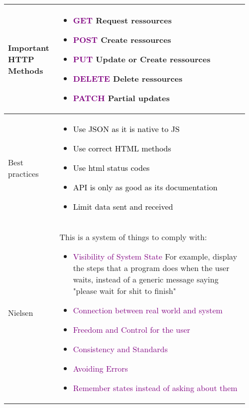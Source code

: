 \documentclass[main.tex,fontsize=8pt,paper=a4,paper=portrait,DIV=calc,]{scrartcl}
\begin{document}
\begin{table}[ht!]
\begin{tabular}{|m{0.2\linewidth}|m{0.755\linewidth}|}
\hline
Important HTTP Methods & 
\vspace{2mm}
\begin{itemize}
\item \textcolor{purple}{GET}\newline
  Request ressources
\item \textcolor{purple}{POST}\newline
  Create ressources
\item \textcolor{purple}{PUT}\newline
  Update or Create ressources
\item \textcolor{purple}{DELETE}\newline
  Delete ressources
\item \textcolor{purple}{PATCH}\newline
  Partial updates
\vspace{-3mm}
\end{itemize} \\
\hline
Best practices & 
\vspace{2mm}
\begin{itemize}
\item \textcolor{black}{Use JSON as it is native to JS}
\item \textcolor{black}{Use correct HTML methods}
\item \textcolor{black}{Use html status codes}
\item \textcolor{black}{API is only as good as its documentation}
\item \textcolor{black}{Limit data sent and received}
\vspace{-3mm}
\end{itemize}\\ 
\hline
Nielsen & 
This is a system of things to comply with:\newline
\begin{itemize}
\item \textcolor{purple}{Visibility of System State}\newline
  For example, display the steps that a program does when the user waits, instead of a generic message saying "please wait for shit to finish"
\item \textcolor{purple}{Connection between real world and system}
\item \textcolor{purple}{Freedom and Control for the user}
\item \textcolor{purple}{Consistency and Standards}
\item \textcolor{purple}{Avoiding Errors}
\item \textcolor{purple}{Remember states instead of asking about them}

\end{itemize}
\end{tabular}
\end{table}
\end{document}
